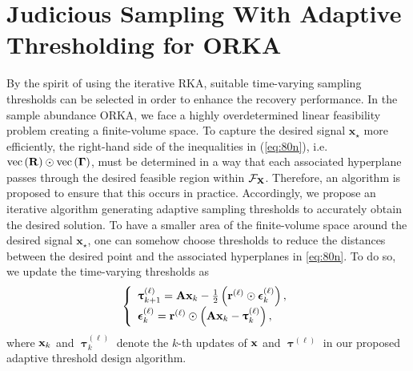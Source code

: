 \documentclass[12pt,draftcls,onecolumn]{IEEEtran}
\begin{document}
\section{Judicious Sampling With Adaptive Thresholding for ORKA}
\label{ada_thresh}
By the spirit of using the iterative RKA, suitable time-varying sampling thresholds can be selected in order to enhance the recovery performance. In the sample abundance ORKA, we face a highly overdetermined linear feasibility problem creating a finite-volume space. To capture the desired signal $\mathbf{x}_{\star}$ more efficiently, the right-hand side of the inequalities in (\ref{eq:80n}), i.e. $\operatorname{vec}\left(\mathbf{R}\right)\odot \operatorname{vec}\left(\boldsymbol{\Gamma}\right)$, must be determined in a way that each associated hyperplane passes through the desired feasible region within $\mathcal{F}_{\mathbf{X}}$. Therefore, an algorithm is proposed to ensure that this occurs in practice. Accordingly, we propose an iterative algorithm generating adaptive sampling thresholds to accurately obtain the desired solution. To have a smaller area of the finite-volume space around the desired signal $\mathbf{x}_{\star}$, one can somehow choose thresholds to reduce the distances between 
the desired point and the associated hyperplanes in \eqref{eq:80n}. To do so, we update the time-varying thresholds 
as
\begin{equation}
\label{eq:200}
\left\{\begin{array}{l}
\boldsymbol{\uptau}^{(\ell)}_{k+1}=\mbA\mbx_{k}-\frac{1}{2}\left(\mbr^{(\ell)}\odot\boldsymbol{\epsilon}^{(\ell)}_{k}\right),\\\boldsymbol{\epsilon}^{(\ell)}_{k}=\mbr^{(\ell)}\odot\left(\mbA\mbx_k-\boldsymbol{\uptau}_{k}^{(\ell)}\right),
\end{array}\right.
\end{equation}\normalsize
where $\mathbf{x}_k$ and $\boldsymbol{\uptau}_{k}^{(\ell)}$ denote the $k$-th updates of $\mathbf{x}$ and $\boldsymbol{\uptau}^{(\ell)}$ in our proposed adaptive threshold design algorithm. 
\end{document}
